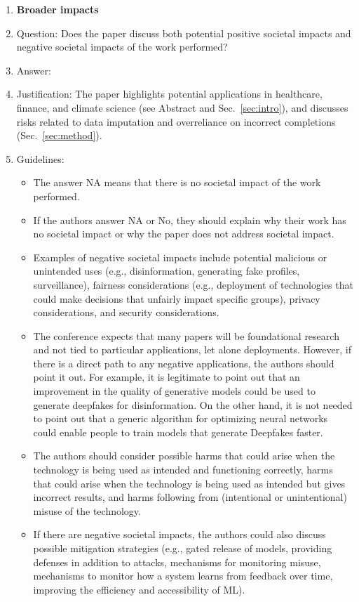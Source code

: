 \documentclass{article}
\theoremstyle{plain}
\theoremstyle{definition}
\theoremstyle{remark}
\begin{document}
{\begin{enumerate}
\item {\bf Broader impacts}
    \item[] Question: Does the paper discuss both potential positive societal impacts and negative societal impacts of the work performed?
    \item[] Answer: \answerYes{}
    \item[] Justification: The paper highlights potential applications in healthcare, finance, and climate science (see Abstract and Sec.~\ref{sec:intro}), and discusses risks related to data imputation and overreliance on incorrect completions (Sec.~\ref{sec:method}).
    \item[] Guidelines:
    \begin{itemize}
        \item The answer NA means that there is no societal impact of the work performed.
        \item If the authors answer NA or No, they should explain why their work has no societal impact or why the paper does not address societal impact.
        \item Examples of negative societal impacts include potential malicious or unintended uses (e.g., disinformation, generating fake profiles, surveillance), fairness considerations (e.g., deployment of technologies that could make decisions that unfairly impact specific groups), privacy considerations, and security considerations.
        \item The conference expects that many papers will be foundational research and not tied to particular applications, let alone deployments. However, if there is a direct path to any negative applications, the authors should point it out. For example, it is legitimate to point out that an improvement in the quality of generative models could be used to generate deepfakes for disinformation. On the other hand, it is not needed to point out that a generic algorithm for optimizing neural networks could enable people to train models that generate Deepfakes faster.
        \item The authors should consider possible harms that could arise when the technology is being used as intended and functioning correctly, harms that could arise when the technology is being used as intended but gives incorrect results, and harms following from (intentional or unintentional) misuse of the technology.
        \item If there are negative societal impacts, the authors could also discuss possible mitigation strategies (e.g., gated release of models, providing defenses in addition to attacks, mechanisms for monitoring misuse, mechanisms to monitor how a system learns from feedback over time, improving the efficiency and accessibility of ML).
    \end{itemize}
    

\end{enumerate}}
\end{document}
